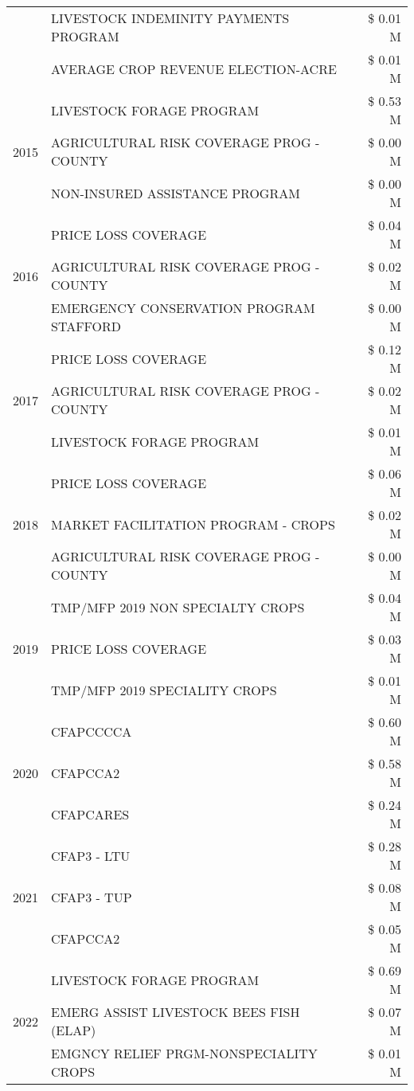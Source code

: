 \begin{tabular}{llr}
 & LIVESTOCK INDEMINITY PAYMENTS PROGRAM & \$ 0.01 M \\
 & AVERAGE CROP REVENUE ELECTION-ACRE & \$ 0.01 M \\
\cline{1-3}
\multirow[t]{3}{*}{2015} & LIVESTOCK FORAGE PROGRAM & \$ 0.53 M \\
 & AGRICULTURAL RISK COVERAGE PROG - COUNTY & \$ 0.00 M \\
 & NON-INSURED ASSISTANCE PROGRAM & \$ 0.00 M \\
\cline{1-3}
\multirow[t]{3}{*}{2016} & PRICE LOSS COVERAGE & \$ 0.04 M \\
 & AGRICULTURAL RISK COVERAGE PROG - COUNTY & \$ 0.02 M \\
 & EMERGENCY CONSERVATION PROGRAM STAFFORD & \$ 0.00 M \\
\cline{1-3}
\multirow[t]{3}{*}{2017} & PRICE LOSS COVERAGE & \$ 0.12 M \\
 & AGRICULTURAL RISK COVERAGE PROG - COUNTY & \$ 0.02 M \\
 & LIVESTOCK FORAGE PROGRAM & \$ 0.01 M \\
\cline{1-3}
\multirow[t]{3}{*}{2018} & PRICE LOSS COVERAGE & \$ 0.06 M \\
 & MARKET FACILITATION PROGRAM - CROPS & \$ 0.02 M \\
 & AGRICULTURAL RISK COVERAGE PROG - COUNTY & \$ 0.00 M \\
\cline{1-3}
\multirow[t]{3}{*}{2019} & TMP/MFP 2019 NON SPECIALTY CROPS & \$ 0.04 M \\
 & PRICE LOSS COVERAGE & \$ 0.03 M \\
 & TMP/MFP 2019 SPECIALITY CROPS & \$ 0.01 M \\
\cline{1-3}
\multirow[t]{3}{*}{2020} & CFAPCCCCA & \$ 0.60 M \\
 & CFAPCCA2 & \$ 0.58 M \\
 & CFAPCARES & \$ 0.24 M \\
\cline{1-3}
\multirow[t]{3}{*}{2021} & CFAP3 - LTU & \$ 0.28 M \\
 & CFAP3 - TUP & \$ 0.08 M \\
 & CFAPCCA2 & \$ 0.05 M \\
\cline{1-3}
\multirow[t]{3}{*}{2022} & LIVESTOCK FORAGE PROGRAM & \$ 0.69 M \\
 & EMERG ASSIST LIVESTOCK BEES FISH (ELAP) & \$ 0.07 M \\
 & EMGNCY RELIEF PRGM-NONSPECIALITY CROPS & \$ 0.01 M \\
\cline{1-3}
\bottomrule
\end{tabular}
